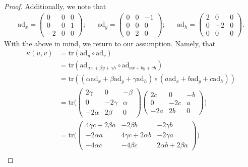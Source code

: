 \documentclass[12pt]{article}
\theoremstyle{definition}
\begin{document}
\begin{enumerate}
\begin{enumerate}[label=(\alph*)]
\begin{proof}
                        Additionally, we note that 
                            \begin{align*}
                                \text{ad}_x=\begin{pmatrix}0&0&0\\0&0&1\\-2&0&0\end{pmatrix};& &\text{ad}_y=\begin{pmatrix}0&0&-1\\0&0&0\\0&2&0\end{pmatrix};& &\text{ad}_h=\begin{pmatrix}2&0&0\\0&-2&0\\0&0&0\end{pmatrix}.
                            \end{align*}
                        With the above in mind, we return to our assumption. Namely, that
                            \begin{equation*}
                                \begin{split}
                                    \kappa(u,v)&=\text{tr}(\text{ad}_u\circ\text{ad}_v) \\
                                    &= \text{tr}(\text{ad}_{\alpha x+\beta y+\gamma h}\circ\text{ad}_{ax+by+ch}) \\
                                    &=\text{tr}((\alpha\text{ad}_x+\beta\text{ad}_y+\gamma\text{ad}_h)\circ(a\text{ad}_x+b\text{ad}_y+c\text{ad}_h)) \\ 
                                    &=\text{tr}\bigg(\begin{pmatrix}2\gamma&0&-\beta\\0&-2\gamma&\alpha\\-2\alpha&2\beta&0\end{pmatrix}\begin{pmatrix}2c&0&-b\\0&-2c&a\\-2a&2b&0\end{pmatrix}\bigg) \\
                                    &=\text{tr}\bigg(\begin{pmatrix}4\gamma c+2\beta a&-2\beta b&-2\gamma b\\-2\alpha a&4\gamma c+2\alpha b&-2\gamma a\\-4\alpha c&-4\beta c&2\alpha b+2\beta a\end{pmatrix}\bigg) \\

\end{split}
\end{equation*}
\end{proof}
\end{enumerate}
\end{enumerate}
\end{document}
